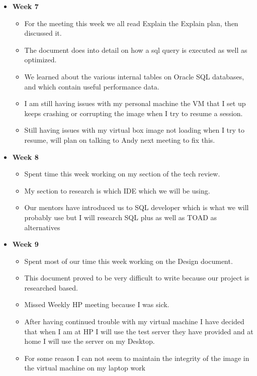 \documentclass[xcolor=dvipsnames]{beamer}
\begin{document}
\begin{frame}
\begin{itemize}
	\item \textbf{Week 7}
   	\begin{itemize}
    	\item For the meeting this week we all read Explain the Explain plan, then discussed it.
        \item The document does into detail on how a sql query is executed as well as optimized.
        \item We learned about the various internal tables on Oracle SQL databases, and which contain useful performance data. 
        \item I am still having issues with my personal machine the VM that I set up keeps crashing or corrupting the image when I try to resume a session.
        \item Still having issues with my virtual box image not loading when I try to resume, will plan on talking to Andy next meeting to fix this. 
	\end{itemize}
\end{itemize}
\end{frame}

\begin{frame}
\begin{itemize}
	\item \textbf{Week 8}
    \begin{itemize}
    	
        \item Spent time this week working on my section of the tech review. 
        \item My section to research is which IDE which we will be using. 
        \item Our mentors have introduced us to SQL developer which is what we will probably use but I will research SQL plus as well as TOAD as alternatives
	\end{itemize}
\end{itemize}
\end{frame}

\begin{frame}
\begin{itemize}
	\item \textbf{Week 9}
    \begin{itemize}
    	\item Spent most of our time this week working on the Design document.
        \item This document proved to be very difficult to write because our project is researched based.
        \item Missed Weekly HP meeting because I was sick.
        \item After having continued trouble with my virtual machine I have decided that when I am at HP I will use the test server they have provided and at home I will use the server on my Desktop.
        \item For some reason I can not seem to maintain the integrity of the image in the virtual machine on my laptop work
	\end{itemize}
\end{itemize}
\end{frame}
\end{document}
